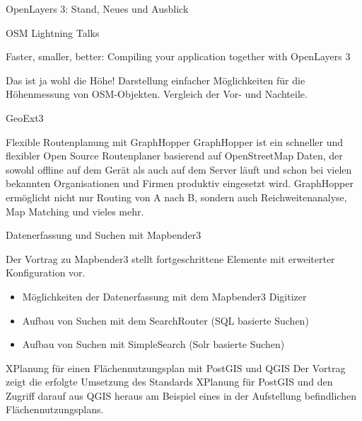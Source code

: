 %
{OpenLayers 3: Stand, Neues und Ausblick}%
{}%
{}

%
{OSM Lightning Talks}%
{}%
{}

%
{Faster, smaller, better: Compiling your application together with OpenLayers 3}%
{}%
{}

%
{Das ist ja wohl die Höhe!}%
{}%
{Darstellung einfacher Möglichkeiten für die Höhenmessung von OSM-Objekten. Vergleich der Vor- und Nachteile.}

%
{GeoExt3}%
{}%
{}

%
{Flexible Routenplanung mit GraphHopper}%
{}%
{GraphHopper ist ein schneller und flexibler Open Source Routenplaner basierend auf OpenStreetMap Daten,
der sowohl offline auf dem Gerät als auch auf dem Server läuft und schon bei vielen bekannten Organisationen
und Firmen produktiv eingesetzt wird. GraphHopper ermöglicht nicht nur Routing von A nach B, sondern auch
Reichweitenanalyse, Map Matching und vieles mehr.}

%
{Datenerfassung und Suchen mit Mapbender3}%
{}%
{Der Vortrag zu Mapbender3 stellt fortgeschrittene Elemente mit erweiterter Konfiguration vor. 
\begin{itemize}
 \item Möglichkeiten der Datenerfassung mit dem Mapbender3 Digitizer
 \item Aufbau von Suchen mit dem SearchRouter (SQL basierte Suchen)
 \item Aufbau von Suchen mit SimpleSearch (Solr basierte Suchen)
\end{itemize}%
}

%
{XPlanung für einen Flächennutzungsplan mit PostGIS und QGIS}%
{}%
{Der Vortrag zeigt die erfolgte Umsetzung des Standards XPlanung für PostGIS und den Zugriff darauf aus
QGIS heraus am Beispiel eines in der Aufstellung befindlichen Flächennutzungsplans. }


